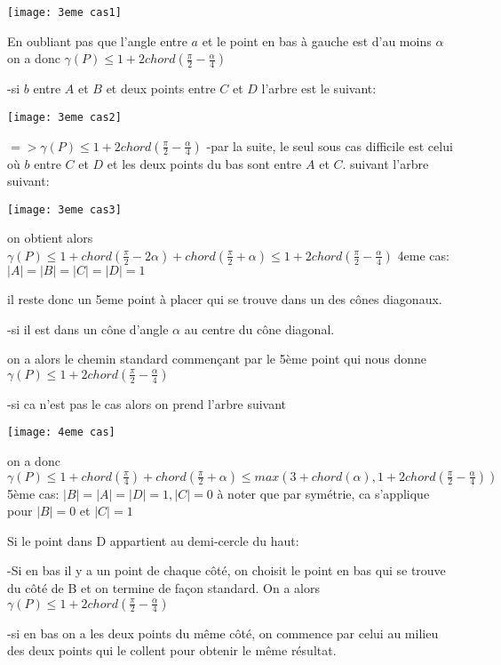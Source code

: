 \texttt{[image: 3eme cas1]}

En oubliant pas que l'angle entre $a$ et le point en bas à gauche est d'au moins $\alpha$ on a donc 
$\gamma(P) \leq 1 + 2chord(\frac{\pi}{2} - \frac{\alpha}{4})$

-si $b$ entre $A$ et $B$ et deux points entre $C$ et $D$
l'arbre est le suivant:

\texttt{[image: 3eme cas2]}

$=> \gamma(P) \leq 1 + 2chord(\frac{\pi}{2} - \frac{\alpha}{4})$
-par la suite, le seul sous cas difficile est celui où $b$ entre $C$ et $D$ et les deux points du bas sont entre $A$ et $C$.
suivant l'arbre suivant:

\texttt{[image: 3eme cas3]}

on obtient alors
\(\gamma(P) \leq 1+chord(\frac{\pi}{2} - 2\alpha) + chord(\frac{\pi}{2} + \alpha) \leq 1 + 2chord(\frac{\pi}{2} - \frac{\alpha}{4})\)
\newline
\newline
4eme cas: $|A| = |B| = |C| = |D| = 1$

il reste donc un 5eme point à placer qui se trouve dans un des cônes diagonaux.

-si il est dans un cône d'angle $\alpha$ au centre du cône diagonal.

on a alors le chemin standard commençant par le 5ème point qui nous donne $\gamma(P) \leq 1 + 2chord(\frac{\pi}{2} - \frac{\alpha}{4})$

-si ca n'est pas le cas alors on prend l'arbre suivant

\texttt{[image: 4eme cas]}

on a donc $\gamma(P) \leq 1 + chord(\frac{\pi}{4}) + chord(\frac{\pi}{2} + \alpha) \leq max(3 + chord(\alpha), 1 + 2chord(\frac{\pi}{2} - \frac{\alpha}{4}))$
\newline
\newline
5ème cas: $|B| = |A| = |D| = 1, |C| = 0$
à noter que par symétrie, ca s'applique pour $|B| = 0$ et $|C| = 1$

Si le point dans D appartient au demi-cercle du haut:

-Si en bas il y a un point de chaque côté, on choisit le point en bas qui se trouve du côté de B et on termine de façon standard. On a alors $\gamma(P) \leq 1 + 2chord(\frac{\pi}{2} - \frac{\alpha}{4})$

-si en bas on a les deux points du même côté, on commence par celui au milieu des deux points qui le collent pour obtenir le même résultat.

